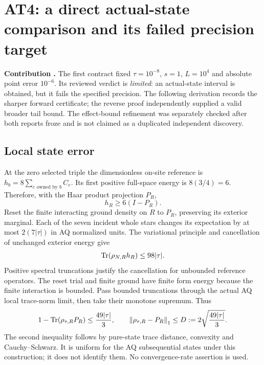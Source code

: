 \section{AT4: a direct actual-state comparison and its failed precision target}
\label{sec:at4}

\textbf{Contribution .} The first contract fixed
$\tau=10^{-8}$, $s=1$, $L=10^4$ and absolute point error $10^{-6}$. Its reviewed
verdict is \emph{limited}: an actual-state interval is obtained, but it fails the
specified precision. The following derivation records the sharper forward
certificate; the reverse proof independently supplied a valid broader tail
bound. The effect-bound refinement was separately checked after both reports
froze and is not claimed as a duplicated independent discovery.

\subsection{Local state error}
At the zero selected triple the dimensionless on-site reference is
$h_b=8\sum_{e\text{ owned by }b}C_e$. Its first positive full-space energy is
$8(3/4)=6$. Therefore, with the Haar product projection $P_R$,
\begin{equation}
 h_R\ge6(I-P_R).
 \label{eq:referencegap}
\end{equation}
Reset the finite interacting ground density on $R$ to $P_R$, preserving its
exterior marginal. Each of the seven incident whole stars changes its
expectation by at most $2(7|\tau|)$ in AQ normalized units. The variational
principle and cancellation of unchanged exterior energy give
\begin{equation}
 \operatorname{Tr}(\rho_{N,R}h_R)\le98|\tau|.
 \label{eq:reset}
\end{equation}
Positive spectral truncations justify the cancellation for unbounded reference
operators. The reset trial and finite ground have finite form energy because
the finite interaction is bounded. Pass bounded truncations through the actual
AQ local trace-norm limit, then take their monotone supremum. Thus
\begin{equation}
 1-\operatorname{Tr}(\rho_{\tau,R}P_R)\le\frac{49|\tau|}{3},\qquad
 \left\lVert\rho_{\tau,R}-P_R\right\rVert_1\le D:=2\sqrt{\frac{49|\tau|}{3}}.
 \label{eq:D}
\end{equation}
The second inequality follows by pure-state trace distance, convexity and
Cauchy--Schwarz. It is uniform for the AQ subsequential states under this
construction; it does not identify them. No convergence-rate assertion is used.

